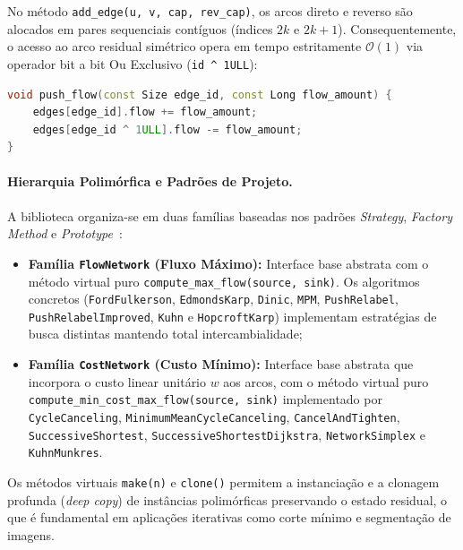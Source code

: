 \documentclass[12pt,a4paper]{article}
\begin{document}
No método \lstinline{add_edge(u, v, cap, rev_cap)}, os arcos direto e reverso são alocados em pares sequenciais contíguos (índices $2k$ e $2k+1$). Consequentemente, o acesso ao arco residual simétrico opera em tempo estritamente $\mathcal{O}(1)$ via operador bit a bit Ou Exclusivo (\lstinline{id ^ 1ULL}):
\begin{lstlisting}[language=C++, numbers=none, basicstyle=\ttfamily\footnotesize, frame=none, backgroundcolor=\color{white}]
void push_flow(const Size edge_id, const Long flow_amount) {
    edges[edge_id].flow += flow_amount;
    edges[edge_id ^ 1ULL].flow -= flow_amount;
}
\end{lstlisting}

\paragraph{Hierarquia Polimórfica e Padrões de Projeto.}
A biblioteca organiza-se em duas famílias baseadas nos padrões \textit{Strategy}, \textit{Factory Method} e \textit{Prototype}~\cite{gamma1994design}:
\begin{itemize}
    \item \textbf{Família \lstinline{FlowNetwork} (Fluxo Máximo):} Interface base abstrata com o método virtual puro \lstinline{compute_max_flow(source, sink)}. Os algoritmos concretos (\lstinline{FordFulkerson}, \lstinline{EdmondsKarp}, \lstinline{Dinic}, \lstinline{MPM}, \lstinline{PushRelabel}, \lstinline{PushRelabelImproved}, \lstinline{Kuhn} e \lstinline{HopcroftKarp}) implementam estratégias de busca distintas mantendo total intercambialidade;
    \item \textbf{Família \lstinline{CostNetwork} (Custo Mínimo):} Interface base abstrata que incorpora o custo linear unitário $w$ aos arcos, com o método virtual puro \lstinline{compute_min_cost_max_flow(source, sink)} implementado por \lstinline{CycleCanceling}, \lstinline{MinimumMeanCycleCanceling}, \lstinline{CancelAndTighten}, \lstinline{SuccessiveShortest}, \lstinline{SuccessiveShortestDijkstra}, \lstinline{NetworkSimplex} e \lstinline{KuhnMunkres}.
\end{itemize}

Os métodos virtuais \lstinline{make(n)} e \lstinline{clone()} permitem a instanciação e a clonagem profunda (\textit{deep copy}) de instâncias polimórficas preservando o estado residual, o que é fundamental em aplicações iterativas como corte mínimo e segmentação de imagens.

\newpage
\end{document}
